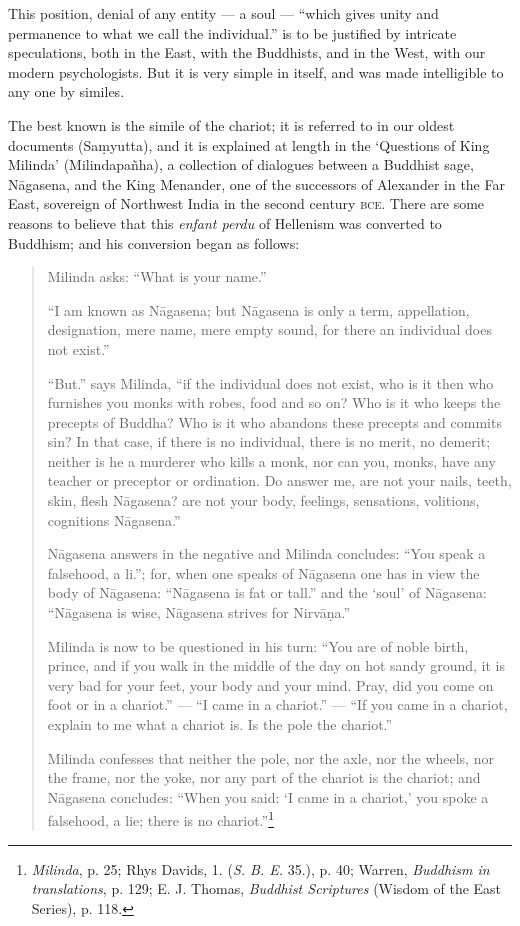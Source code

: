 \documentclass[a4paper, 11pt, oneside, english]{article}
\begin{document}
This position, denial of any entity --- a soul --- ``which gives unity and permanence to what we call the individual.'' is to be justified by intricate speculations, both in the East, with the Buddhists, and in the West, with our modern psychologists. But it is very simple in itself, and was made intelligible to any one by similes.

The best known is the simile of the chariot; it is referred to in our oldest documents (Saṃyutta), and it is explained at length in the `Questions of King Milinda' (Milindapañha), a collection of dialogues between a Buddhist sage, Nāgasena, and the King Menander, one of the successors of Alexander in the Far East, sovereign of Northwest India in the second century \textsc{bce}. There are some reasons to believe that this \emph{enfant perdu} of Hellenism was converted to Buddhism; and his conversion began as follows: 
\begin{quotation}
\small
Milinda asks: ``What is your name.''

``I am known as Nāgasena; but Nāgasena is only a term, appellation, designation, mere name, mere empty sound, for there an individual does not exist.''

``But.'' says Milinda, ``if the individual does not exist, who is it then who furnishes you monks with robes, food and so on? Who is it who keeps the precepts of Buddha? Who is it who abandons these precepts and commits sin? In that case, if there is no individual, there is no merit, no demerit; neither is he a murderer who kills a monk, nor can you, monks, have any teacher or preceptor or ordination. Do answer me, are not your nails, teeth, skin, flesh Nāgasena? are not your body, feelings, sensations, volitions, cognitions Nāgasena.''

Nāgasena answers in the negative and Milinda concludes: ``You speak a falsehood, a li.''; for, when one speaks of Nāgasena one has in view the body of Nāgasena: ``Nāgasena is fat or tall.'' and the `soul' of Nāgasena: ``Nāgasena is wise, Nāgasena strives for Nirvāṇa.''

Milinda is now to be questioned in his turn: ``You are of noble birth, prince, and if you walk in the middle of the day on hot sandy ground, it is very bad for your feet, your body and your mind. Pray, did you come on foot or in a chariot.'' --- ``I came in a chariot.'' --- ``If you came in a chariot, explain to me what a chariot is. Is the pole the chariot.''

Milinda confesses that neither the pole, nor the axle, nor the wheels, nor the frame, nor the yoke, nor any part of the chariot is the chariot; and Nāgasena concludes: ``When you said: `I came in a chariot,' you spoke a falsehood, a lie; there is no chariot.''\footnote{\emph{Milinda}, p. 25; Rhys Davids, 1. (\emph{S. B. E.} 35.), p. 40; Warren, \emph{Buddhism in translations}, p. 129; E. J. Thomas, \emph{Buddhist Scriptures} (Wisdom of the East Series), p. 118.}
\end{quotation}
\end{document}
